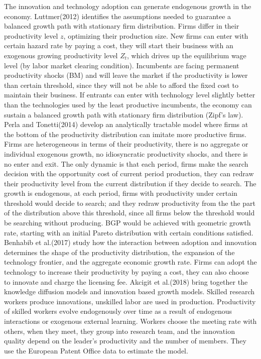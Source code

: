 \documentclass{article}
\newcommand{\1}{\mathbb{1}}
\begin{document}
The innovation and technology adoption can generate endogenous growth in the economy. 
Luttmer(2012)\cite{Luttmer2012} identifies the assumptions needed to guarantee a balanced growth path with stationary firm distribution. Firms differ in their productivity level $z$, optimizing their production size. New firms can enter with certain hazard rate by paying a cost, they will start their business with an exogenous growing productivity level $Z_t$, which drives up the equilibrium wage level (by labor market clearing condition). Incumbents are facing permanent productivity shocks (BM) and will leave the market if the productivity is lower than certain threshold, since they will not be able to afford the fixed cost to maintain their business. If entrants can enter with technology level slightly better than the technologies used by the least productive incumbents, the economy can sustain a balanced growth path with stationary firm distribution (Zipf's law).
Perla and Tonetti(2014)\cite{PerlaTonetti2014} develop an analytically tractable model where firms at the bottom of the productivity distribution can imitate more productive firms. Firms are heterogeneous in terms of their productivity, there is no aggregate or individual exogenous growth, no idiosyncratic productivity shocks, and there is no enter and exit. The only dynamic is that each period, firms make the search decision with the opportunity cost of current period production, they can redraw their productivity level from the current distribution if they decide to search. The growth is endogenous, at each period, firms with productivity under certain threshold would decide to search; and they redraw productivity from the the part of the distribution above this threshold, since all firms below the threshold would be searching without producing. BGP would be achieved with geometric growth rate, starting with an initial Pareto distribution with certain conditions satisfied. 
Benhabib et al.(2017)\cite{Benhabibetal2017} study how the interaction between adoption and innovation determines the shape of the productivity distribution, the expansion of the technology frontier, and the aggregate economic growth rate. Firms can adopt the technology to increase their productivity by paying a cost, they can also choose to innovate and charge the licensing fee. 
Akcigit et al.(2018)\cite{Akcigitetal2018} bring together the knowledge diffusion models and innovation based growth models. Skilled research workers produce innovations, unskilled labor are used in production.  Productivity of skilled workers evolve endogenously over time as a result of endogenous interactions or exogenous external learning. Workers choose the meeting rate with others, when they meet, they group into research team, and the innovation quality depend on the leader's productivity and the number of members. They use the European Patent Office data to estimate the model.  \\
\end{document}
